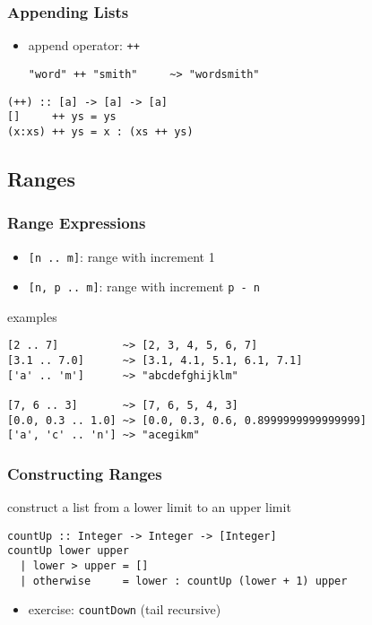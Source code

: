 \documentclass[dvipsnames]{beamer}
\theoremstyle{plain}
\begin{document}
\begin{frame}[fragile]
  \frametitle{Appending Lists}

  \begin{itemize}
    \item append operator: \lstinline|++|
    \begin{lstlisting}[frame=none]
"word" ++ "smith"     ~> "wordsmith"
    \end{lstlisting}
  \end{itemize}

  \begin{exampleblock}{}
    \begin{lstlisting}
(++) :: [a] -> [a] -> [a]
[]     ++ ys = ys
(x:xs) ++ ys = x : (xs ++ ys)
    \end{lstlisting}
  \end{exampleblock}
\end{frame}

\subsection{Ranges}

\begin{frame}[fragile]
  \frametitle{Range Expressions}

  \begin{itemize}
    \item \lstinline|[n .. m]|: range with increment 1
    \item \lstinline|[n, p .. m]|: range with increment \texttt{p - n}
  \end{itemize}

  \begin{exampleblock}{examples}
    \begin{lstlisting}
[2 .. 7]          ~> [2, 3, 4, 5, 6, 7]
[3.1 .. 7.0]      ~> [3.1, 4.1, 5.1, 6.1, 7.1]
['a' .. 'm']      ~> "abcdefghijklm"

[7, 6 .. 3]       ~> [7, 6, 5, 4, 3]
[0.0, 0.3 .. 1.0] ~> [0.0, 0.3, 0.6, 0.8999999999999999]
['a', 'c' .. 'n'] ~> "acegikm"
    \end{lstlisting}
  \end{exampleblock}
\end{frame}

\begin{frame}[fragile]
  \frametitle{Constructing Ranges}

  \begin{exampleblock}{construct a list from a lower limit to an upper limit}
    \begin{lstlisting}
countUp :: Integer -> Integer -> [Integer]
countUp lower upper
  | lower > upper = []
  | otherwise     = lower : countUp (lower + 1) upper
    \end{lstlisting}
  \end{exampleblock}

  \pause
  \begin{itemize}
    \item exercise: \lstinline|countDown| (tail recursive)
  \end{itemize}
\end{frame}
\end{document}
